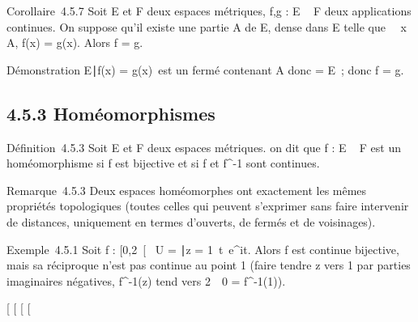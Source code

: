 \documentclass[]{article}
\begin{document}
Corollaire~4.5.7 Soit E et F deux espaces métriques, f,g : E \rightarrow~ F deux
applications continues. On suppose qu'il existe une partie A de E, dense
dans E telle que \forall~~x \in A, f(x) = g(x). Alors f
= g.

Démonstration \x \in E∣f(x) =
g(x)\ est un fermé contenant A donc
\overlineA = E~; donc f = g.

\subsection{4.5.3 Homéomorphismes}

Définition~4.5.3 Soit E et F deux espaces métriques. on dit que f : E \rightarrow~
F est un homéomorphisme si f est bijective et si f et f^-1
sont continues.

Remarque~4.5.3 Deux espaces homéomorphes ont exactement les mêmes
propriétés topologiques (toutes celles qui peuvent s'exprimer sans faire
intervenir de distances, uniquement en termes d'ouverts, de fermés et de
voisinages).

Exemple~4.5.1 Soit f : [0,2\pi~[\rightarrow~ U = \z \in
{}∣z =
1\, t\mapsto~e^it. Alors
f est continue bijective, mais sa réciproque n'est pas continue au point
1 (faire tendre z vers 1 par parties imaginaires négatives,
f^-1(z) tend vers 2\pi~\neq~0 =
f^-1(1)).

[
[
[
[
\end{document}
